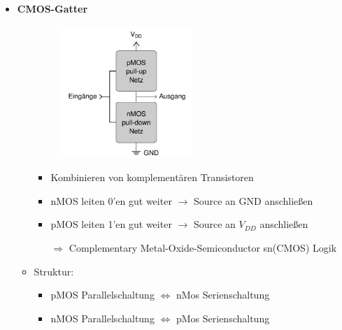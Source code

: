 \documentclass[11pt,a4paper]{article}
\begin{document}
\begin{itemize}
\item \textbf{CMOS-Gatter}
	\begin{itemize}
		\item[]		
			\begin{minipage}{0.3\textwidth}
				\begin{figure}[H]
				\includegraphics[height=5cm]{Bilder/cmos}
				\end{figure}
			\end{minipage}
			\begin{minipage}[t]{0.7\textwidth}
				\vspace{-1.25cm}
				\begin{itemize}
				\item Kombinieren von komplementären Transistoren
				\item nMOS leiten 0'en gut weiter $\rightarrow$ Source an GND anschließen
				\item pMOS leiten 1'en gut weiter $\rightarrow$ Source an $V_{DD}$ anschließen
				\item[$\Rightarrow$] Complementary Metal-Oxide-Semiconductor sn(CMOS) Logik
				\end{itemize}
			\end{minipage}	
		
		\item Struktur: 
			\begin{itemize}
			\item pMOS Parallelschaltung $\Leftrightarrow$ nMos Serienschaltung
			\item nMOS Parallelschaltung $\Leftrightarrow$ pMos Serienschaltung
			\end{itemize}
		

\end{itemize}
\end{itemize}
\end{document}
